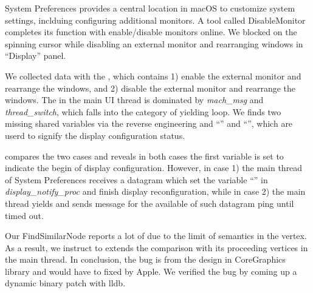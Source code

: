 System Preferences provides a central location in macOS to customize
system settings, inclduing configuring additional monitors. A tool called
DisableMonitor~\cite{disablemonitor} completes its function with enable/disable
monitors online. We blocked on the spinning cursor while disabling an external
monitor and rearranging windows in ``Display'' panel.

We collected data with the \xxx, which contains 1) enable the external
monitor and rearrange the windows, and 2) disable the external monitor and
rearrange the windows. The \spinningnode in the main UI thread is dominated by
\textit{mach\_msg} and \textit{thread\_switch}, which falls into the category of
yielding loop. We finds two missing shared variables via the reverse engineering
and ``'' and ``'',
which are userd to signify the display configuration status.

\xxx compares the two cases and reveals in both cases the first variable is
set to indicate the begin of display configuration. However, in case 1) the
main thread of System Preferences receives a datagram which set the variable
``'' in \textit{display\_notify\_proc} and finish
display reconfiguration, while in case 2) the main thread yields and sends
message for the available of such datagram ping until timed out.

Our FindSimilarNode reports a lot of \similarnodes due to the limit of semantics
in the vertex. As a result, we instruct \xxx to extends the comparison with its
proceeding vertices in the main thread. In conclusion, the bug is from the design
in CoreGraphics library and would have to fixed by Apple. We verified the bug by
coming up a dynamic binary patch with lldb.

